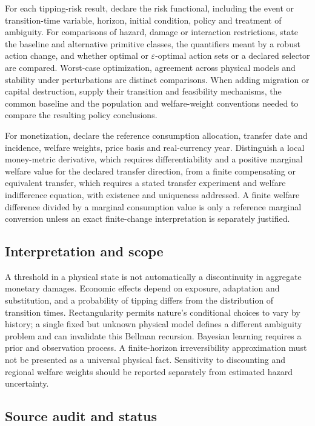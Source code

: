 \documentclass[11pt,a4paper]{article}
\begin{document}
For each tipping-risk result, declare the risk functional, including the event or transition-time variable, horizon, initial condition, policy and treatment of ambiguity. For comparisons of hazard, damage or interaction restrictions, state the baseline and alternative primitive classes, the quantifiers meant by a robust action change, and whether optimal or $\varepsilon$-optimal action sets or a declared selector are compared. Worst-case optimization, agreement across physical models and stability under perturbations are distinct comparisons. When adding migration or capital destruction, supply their transition and feasibility mechanisms, the common baseline and the population and welfare-weight conventions needed to compare the resulting policy conclusions.

For monetization, declare the reference consumption allocation, transfer date and incidence, welfare weights, price basis and real-currency year. Distinguish a local money-metric derivative, which requires differentiability and a positive marginal welfare value for the declared transfer direction, from a finite compensating or equivalent transfer, which requires a stated transfer experiment and welfare indifference equation, with existence and uniqueness addressed. A finite welfare difference divided by a marginal consumption value is only a reference marginal conversion unless an exact finite-change interpretation is separately justified.

\subsection*{Interpretation and scope}

A threshold in a physical state is not automatically a discontinuity in aggregate monetary damages. Economic effects depend on exposure, adaptation and substitution, and a probability of tipping differs from the distribution of transition times. Rectangularity permits nature's conditional choices to vary by history; a single fixed but unknown physical model defines a different ambiguity problem and can invalidate this Bellman recursion. Bayesian learning requires a prior and observation process. A finite-horizon irreversibility approximation must not be presented as a universal physical fact. Sensitivity to discounting and regional welfare weights should be reported separately from estimated hazard uncertainty.

\subsection*{Source audit and status}
\end{document}
